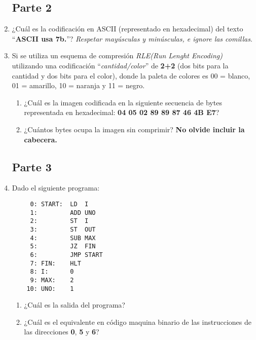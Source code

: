 \documentclass[12pt]{article}
\begin{document}
\begin{enumerate}
\subsection*{Parte 2}

    \item ¿Cuál es la codificación en ASCII (representado en hexadecimal) del
        texto ``\textbf{ASCII usa 7b.}''? \emph{Respetar mayúsculas y
        minúsculas, e ignore las comillas}.

    \item Si se utiliza un esquema de compresión \emph{RLE(Run Lenght
        Encoding)} utilizando una codificación ``\emph{cantidad/color}'' de
        \textbf{2+2} (dos bits para la cantidad y dos bits para el color),
        donde la paleta de colores es 00 = blanco, 01 = amarillo, 10 = naranja
        y 11 = negro.

        \begin{enumerate}

            \item ¿Cuál es la imagen codificada en la siguiente secuencia de
                bytes representada en hexadecimal: \textbf{04 05 02 89 89 87
                46 4B E7}?

            \item ¿Cuántos bytes ocupa la imagen sin comprimir? \textbf{No
                olvide incluir la cabecera.}

        \end{enumerate}


\subsection*{Parte 3}

    \item Dado el siguiente programa:

        \begin{verbatim}
     0: START:  LD  I
     1:         ADD UNO
     2:         ST  I
     3:         ST  OUT
     4:         SUB MAX
     5:         JZ  FIN
     6:         JMP START
     7: FIN:    HLT
     8: I:      0
     9: MAX:    2
    10: UNO:    1
        \end{verbatim}

        \begin{enumerate}

            \item ¿Cuál es la salida del programa?

            \item ¿Cuál es el equivalente en código maquina binario de las
                instrucciones de las direcciones \textbf{0}, \textbf{5} y
                \textbf{6}?


\end{enumerate}
\end{enumerate}
\end{document}
